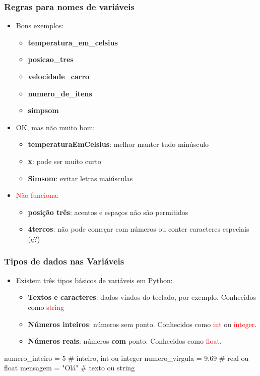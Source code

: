 \documentclass{beamer}
\begin{document}
\begin{frame}[fragile]
  \frametitle{Regras para nomes de variáveis}
  \scriptsize
  \begin{itemize}
    \item Bons exemplos:
    \begin{itemize} \scriptsize
        \item \textbf{temperatura\_em\_celsius}
        \item \textbf{posicao\_tres}
        \item \textbf{velocidade\_carro}
        \item \textbf{numero\_de\_itens}
        \item \textbf{simpsom}
    \end{itemize}
    \item OK, mas não muito bom:
    \begin{itemize} \scriptsize
      \item \textbf{temperaturaEmCelsius}: melhor manter tudo minúsculo
      \item \textbf{x}: pode ser muito curto
      \item \textbf{Simsom}: evitar letras maiúsculas
    \end{itemize}
    \item \textcolor{red}{Não funciona:}
    \begin{itemize} \scriptsize
      \item \textbf{posição três}: acentos e espaços não são permitidos
      \item \textbf{4tercos}: não pode começar com números ou conter caracteres especiais (ç?)
    \end{itemize}

  \end{itemize}
\end{frame}

\begin{frame}[fragile]
  \frametitle{Tipos de dados nas Variáveis}

  \begin{itemize}
    \vfill \item Existem três tipos básicos de variáveis em Python:

    \begin{itemize}
      \item \textbf{Textos e caracteres}: dados vindos do teclado, por exemplo. Conhecidos como \textcolor{red}{string}
      \item \textbf{Números inteiros}: números sem ponto. Conhecidos como \textcolor{red}{int} ou \textcolor{red}{integer}.
      \item \textbf{Números reais}: números \textbf{com} ponto. Conhecidos como \textcolor{red}{float}.
    \end{itemize}
  \end{itemize}

\vfill \begin{python}
numero_inteiro = 5      # inteiro, int ou integer
numero_virgula  =  9.69 # real ou float
mensagem = "Olá"        # texto ou string
\end{python}  
\end{frame}
\end{document}
